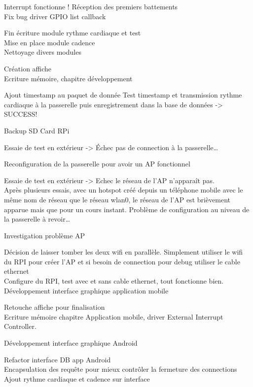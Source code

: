 \begin{multicols}{2}
Interrupt fonctionne ! Réception des premiers battements\\
Fix bug driver GPIO list callback

Fin écriture module rythme cardiaque et test\\
Mise en place module cadence\\
Nettoyage divers modules

Création affiche\\
Ecriture mémoire, chapitre développement

Ajout timestamp au paquet de donnée
Test timestamp et transmission rythme cardiaque à la passerelle puis enregistrement dans la base de données -> SUCCESS!

Backup SD Card RPi

Essaie de test en extérieur -> Échec pas de connection à la passerelle…

Reconfiguration de la passerelle pour avoir un AP fonctionnel

Essaie de test en extérieur -> Echec le réseau de l’AP n’apparaît pas.\\
Après plusieurs essais, avec un hotspot créé depuis un téléphone mobile avec le même nom de réseau que le réseau wlan0, le réseau de l’AP est brièvement apparue mais que pour un cours instant. Problème de configuration au niveau de la passerelle à revoir…

Investigation problème AP

Décision de laisser tomber les deux wifi en parallèle. Simplement utiliser le wifi du RPI pour créer l’AP et si besoin de connection pour debug utiliser le cable ethernet\\
Configure du RPI, test avec et sans cable ethernet, tout fonctionne bien.\\
Développement interface graphique application mobile

Retouche affiche pour finalisation\\
Ecriture mémoire chapitre Application mobile, driver External Interrupt Controller.

Développement interface graphique Android

Refactor interface DB app Android\\
Encapsulation des requête pour mieux contrôler la fermeture des connections\\
Ajout rythme cardiaque et cadence sur interface


\end{multicols}
